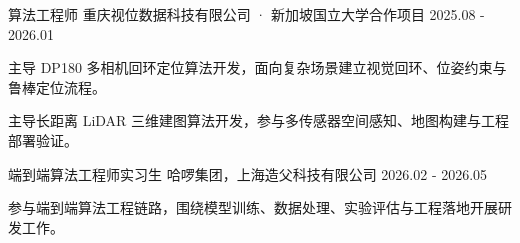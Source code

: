 \begin{cventries}

  \cventry
    {算法工程师}
    {重庆视位数据科技有限公司 · 新加坡国立大学合作项目}
    {}
    {2025.08 - 2026.01}
    {
      \begin{cvitems}
        \item {主导 DP180 多相机回环定位算法开发，面向复杂场景建立视觉回环、位姿约束与鲁棒定位流程。}
        \item {主导长距离 LiDAR 三维建图算法开发，参与多传感器空间感知、地图构建与工程部署验证。}
      \end{cvitems}
    }

  \cventry
    {端到端算法工程师实习生}
    {哈啰集团，上海造父科技有限公司}
    {}
    {2026.02 - 2026.05}
    {
      \begin{cvitems}
        \item {参与端到端算法工程链路，围绕模型训练、数据处理、实验评估与工程落地开展研发工作。}
      \end{cvitems}
    }

\end{cventries}
